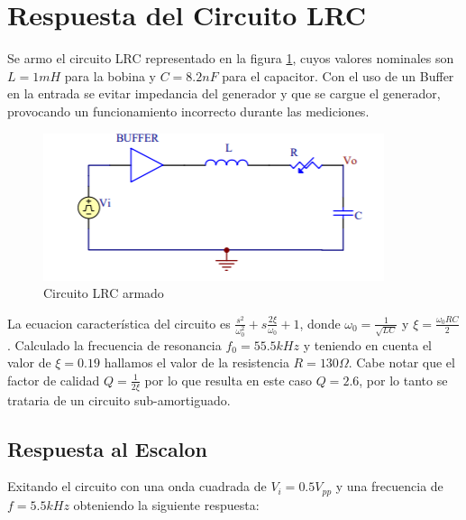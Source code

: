 \section{Respuesta del Circuito LRC}

Se armo el circuito LRC representado en la figura \ref{fig:LRC2}, cuyos valores nominales son $L=1mH$ para la bobina y $C=8.2nF$ para el capacitor. Con el uso de un Buffer en la entrada se evitar impedancia del generador y que se cargue el generador, provocando un funcionamiento incorrecto durante las mediciones.

\begin{figure}[h!]
\centering
\includegraphics[scale=0.5]{lrcCircuito.png}
\caption{Circuito LRC armado}
\label{fig:LRC2}
\end{figure}

La ecuacion característica del circuito es $\frac{s^2}{\omega_0^2}+s\frac{2\xi}{\omega_0}+1$, donde $\omega_0 = \frac{1}{\sqrt{LC}}$ y $\xi = \frac{\omega_0RC}{2}$. Calculado la frecuencia de resonancia $f_0=55.5kHz$ y teniendo en cuenta el valor de $\xi = 0.19$ hallamos el valor de la resistencia $R = 130\Omega$. Cabe notar que el factor de calidad $Q = \frac{1}{2\xi}$ por lo que resulta en este caso $Q = 2.6$, por lo tanto se trataria de un circuito sub-amortiguado. 

\subsection{Respuesta al Escalon}

Exitando el circuito con una onda cuadrada de $V_i = 0.5V_{pp}$ y una frecuencia de $f = 5.5kHz$ obteniendo la siguiente respuesta:

